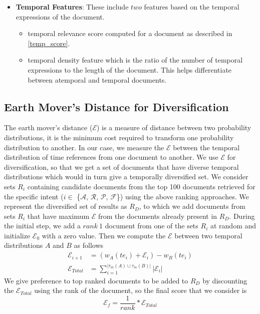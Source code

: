 \documentclass{sig-alternate}
\begin{document}
\begin{itemize}
\item\textbf{Temporal Features}: These include $two$ features based on the temporal expressions of the document.
       \begin{itemize}
       \item \textsf{temporal relevance score} computed for a document as described in \ref{temp_score}.
       \item \textsf{temporal density feature} which is the ratio of the number of temporal expressions to the length of the document. This helps differentiate between atemporal and temporal documents. 
       \end{itemize}
\end{itemize}
\subsection{Earth Mover's Distance for Diversification}\label{diversification}
The earth mover's distance ($\mathcal E$) is a measure of distance between two probability distributions, it is the minimum cost required to transform one probability distribution to another. In our case, we measure the $\mathcal E$ between the temporal distribution of time references from one document to another.  We use $\mathcal E$ for diversification, so that we get a set of documents that have diverse temporal distributions which would in turn give a temporally diversified set. We consider sets $R_{i}$ containing candidate documents from the top 100 documents retrieved for the specific intent ($i \in$ \{$\mathcal A$, $\mathcal R$, $\mathcal P$, $\mathcal F$\}) using the above ranking approaches. We represent the diversified set of results as $R_{D}$, to which we add documents from sets $R_{i}$ that have maximum $\mathcal E$ from the documents already present in $R_{D}$. During the initial step, we add a $rank\ 1$ document from one of the sets $R_{i}$ at random and initialize $\mathcal E_{0}$ with a zero value. Then we compute the $\mathcal E$ between two temporal distributions $A$ and $B$ as follows
\begin{equation}\label{eq:8}
	\begin{aligned}
		\mathcal E_{i+1} &= (w_{A}(te_{i}) + \mathcal E_{i}) - w_{B}(te_{i}) \\
		\mathcal E_{Total} &= \sum\limits_{i=1}^{|\tau_{m}(A) \cup \tau_{m}(B)|}|\mathcal E_{i}|
	\end{aligned}
\end{equation}
We give preference to top ranked documents to be added to $R_{D}$ by discounting the $\mathcal E_{Total}$ using the rank of the document, so the final score that we consider is
\begin{equation}\label{eq:9}
       \mathcal E_{f} = \frac{1}{rank} * \mathcal E_{Total}
\end{equation}
\end{document}
